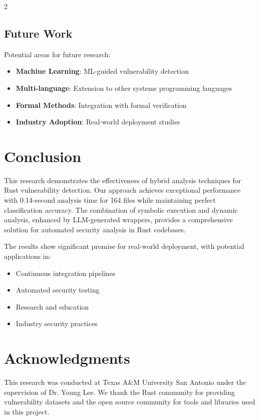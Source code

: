 \documentclass[12pt,a4paper]{article}
\begin{document}
\begin{multicols}{2}
\subsection{Future Work}

Potential areas for future research:

\begin{itemize}
    \item \textbf{Machine Learning}: ML-guided vulnerability detection
    \item \textbf{Multi-language}: Extension to other systems programming languages
    \item \textbf{Formal Methods}: Integration with formal verification
    \item \textbf{Industry Adoption}: Real-world deployment studies
\end{itemize}

\section{Conclusion}

This research demonstrates the effectiveness of hybrid analysis techniques for Rust vulnerability detection. Our approach achieves exceptional performance with 0.14-second analysis time for 164 files while maintaining perfect classification accuracy. The combination of symbolic execution and dynamic analysis, enhanced by LLM-generated wrappers, provides a comprehensive solution for automated security analysis in Rust codebases.

The results show significant promise for real-world deployment, with potential applications in:
\begin{itemize}
    \item Continuous integration pipelines
    \item Automated security testing
    \item Research and education
    \item Industry security practices
\end{itemize}

\section*{Acknowledgments}

This research was conducted at Texas A\&M University San Antonio under the supervision of Dr. Young Lee. We thank the Rust community for providing vulnerability datasets and the open source community for tools and libraries used in this project.

\end{multicols}
\end{document}
